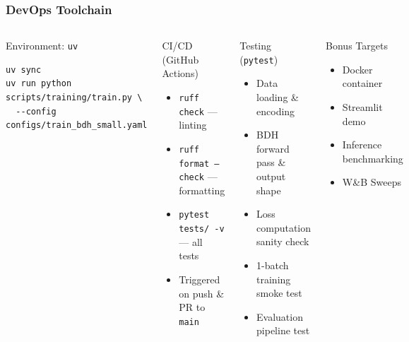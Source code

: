 \documentclass{beamer}
\begin{document}
\begin{frame}[fragile]
\frametitle{DevOps Toolchain}

\begin{columns}
\begin{block}{Environment: \texttt{uv}}
\footnotesize
\begin{verbatim}
uv sync
uv run python scripts/training/train.py \
  --config configs/train_bdh_small.yaml
\end{verbatim}
\end{block}

\vspace{0.5em}
\begin{block}{CI/CD (GitHub Actions)}
\footnotesize
\begin{itemize}
    \item \texttt{ruff check} --- linting
    \item \texttt{ruff format --check} --- formatting
    \item \texttt{pytest tests/ -v} --- all tests
    \item Triggered on push \& PR to \texttt{main}
\end{itemize}
\end{block}

\begin{block}{Testing (\texttt{pytest})}
\footnotesize
\begin{itemize}
    \item Data loading \& encoding
    \item BDH forward pass \& output shape
    \item Loss computation sanity check
    \item 1-batch training smoke test
    \item Evaluation pipeline test
\end{itemize}
\end{block}

\vspace{0.5em}
\begin{block}{Bonus Targets}
\footnotesize
\begin{itemize}
    \item Docker container
    \item Streamlit demo
    \item Inference benchmarking
    \item W\&B Sweeps
\end{itemize}
\end{block}
\end{columns}

\end{frame}
\end{document}
